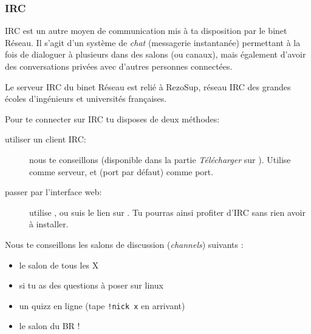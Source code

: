 
\subsubsection{IRC}

\label{irc}

IRC est un autre moyen de communication mis à ta disposition par le binet Réseau. Il s'agit d'un système de \emph{chat} (messagerie instantanée) permettant à la fois de dialoguer à plusieurs dans des salons (ou canaux), mais également d'avoir des conversations privées avec d'autres personnes connectées.


Le serveur IRC du binet Réseau est relié à RezoSup, réseau IRC des grandes écoles d'ingénieurs et universités françaises.

Pour te connecter sur IRC tu disposes de deux méthodes:



\begin{description}
\item[utiliser un client IRC:] nous te conseillons  (disponible dans la partie \emph{Télécharger} sur \fkz). Utilise   comme serveur, et  (port par défaut) comme port.
  \item[passer par l'interface web:] utilise , ou suis le lien  sur \fkz. Tu pourras ainsi profiter d'IRC sans rien avoir à  installer.
\end{description}

 
Nous te conseillons les salons de discussion (\emph{channels}) suivants :
\begin{itemize}
  \item {} le salon de tous les X
  \item {} si tu as des questions \`a poser sur linux
  \item {} un quizz en ligne (tape \texttt{!nick x} en arrivant)
  \item {} le salon du BR !
\end{itemize}
